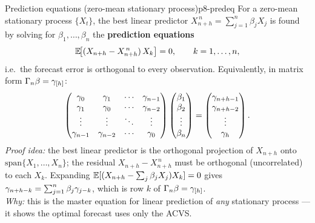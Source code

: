 \begin{theorem}{Prediction equations (zero-mean stationary process)}{p8-predeq}
For a zero-mean stationary process $\{X_t\}$, the best linear predictor
$X^{\,n}_{n+h}=\sum_{j=1}^n\beta_j X_j$ is found by solving for
$\beta_1,\dots,\beta_n$ the \textbf{prediction equations}
\[
\mathbb{E}\!\big[(X_{n+h}-X^{\,n}_{n+h})\,X_k\big]=0,\qquad k=1,\dots,n,
\]
i.e.\ the forecast error is orthogonal to every observation. Equivalently, in
matrix form $\Gamma_n\beta=\gamma_{[h]}$:
\[
\begin{pmatrix}
\gamma_0 & \gamma_1 & \cdots & \gamma_{n-1}\\
\gamma_1 & \gamma_0 & \cdots & \gamma_{n-2}\\
\vdots & \vdots & \ddots & \vdots\\
\gamma_{n-1} & \gamma_{n-2} & \cdots & \gamma_0
\end{pmatrix}
\begin{pmatrix}\beta_1\\ \beta_2\\ \vdots\\ \beta_n\end{pmatrix}
=\begin{pmatrix}\gamma_{n+h-1}\\ \gamma_{n+h-2}\\ \vdots\\ \gamma_{h}\end{pmatrix}.
\]
\textit{Proof idea:} the best linear predictor is the orthogonal projection of
$X_{n+h}$ onto $\mathrm{span}\{X_1,\dots,X_n\}$; the residual
$X_{n+h}-X^{\,n}_{n+h}$ must be orthogonal (uncorrelated) to each $X_k$.
Expanding $\mathbb{E}[(X_{n+h}-\sum_j\beta_jX_j)X_k]=0$ gives
$\gamma_{n+h-k}=\sum_{j=1}^n\beta_j\gamma_{j-k}$, which is row $k$ of
$\Gamma_n\beta=\gamma_{[h]}$.\\[2pt]
\textit{Why:} this is the master equation for linear prediction of \emph{any}
stationary process --- it shows the optimal forecast uses only the ACVS.
\end{theorem}

